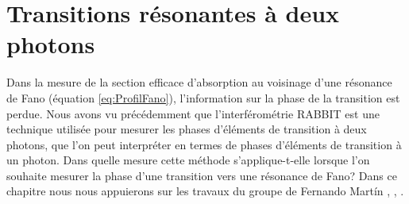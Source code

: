 \chapter{Transitions résonantes à deux photons}
\label{chap:2photons_et_Fano}
Dans la mesure de la section efficace d'absorption au voisinage d'une résonance de Fano (équation \ref{eq:ProfilFano}), l'information sur la phase de la transition est perdue. Nous avons vu précédemment que l'interférométrie RABBIT est une technique utilisée pour mesurer les phases d'éléments de transition à deux photons, que l'on peut interpréter en termes de phases d'éléments de transition à un photon. Dans quelle mesure cette méthode s'applique-t-elle lorsque l'on souhaite mesurer la phase d'une transition vers une résonance de Fano? Dans ce chapitre nous nous appuierons sur les travaux du groupe de Fernando Mart\'{i}n , , .

